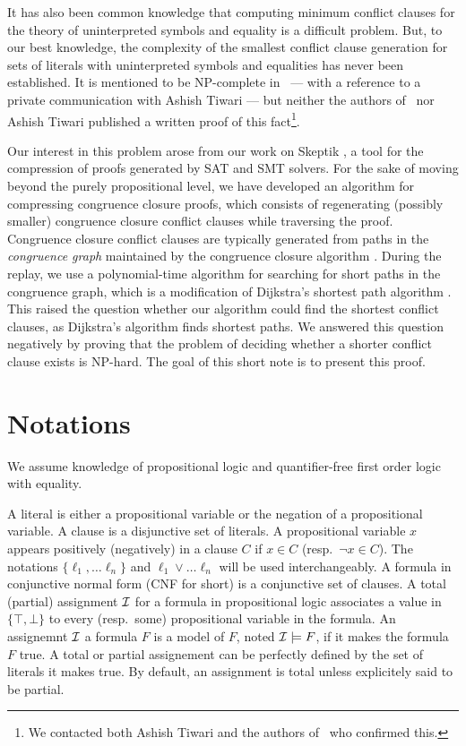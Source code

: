 \documentclass{easychair}
\begin{document}
It has also been common knowledge that computing minimum conflict clauses for
the theory of uninterpreted symbols and equality is a difficult problem.  But,
to our best knowledge, the complexity of the smallest conflict clause generation
for sets of literals with uninterpreted symbols and equalities has never been
established.  It is mentioned to be NP-complete in~\cite{Nieuwenhuis8} --- with
a reference to a private communication with Ashish Tiwari --- but neither the
authors of~\cite{Nieuwenhuis8} nor Ashish Tiwari published a written proof of
this fact\footnote{We contacted both Ashish Tiwari and the authors
  of~\cite{Nieuwenhuis8} who confirmed this.}.

Our interest in this problem arose from our work on Skeptik \cite{Boudou1}, a tool for the compression of proofs generated by SAT and SMT solvers. For the sake of moving beyond the purely propositional level, we have developed an algorithm for compressing congruence closure proofs, which consists of regenerating (possibly smaller) congruence closure conflict clauses while traversing the proof. Congruence closure conflict clauses are typically generated from paths in the \emph{congruence graph} maintained by the congruence closure algorithm \cite{Fontaine2004,Nieuwenhuis6,Nieuwenhuis9}. During the replay, we use a polynomial-time algorithm for searching for short paths in the congruence graph, which is a modification of Dijkstra's shortest path algorithm \cite{Dijkstra1959}. This raised the question whether our algorithm could find the shortest conflict clauses, as Dijkstra's algorithm finds shortest paths. We answered this question negatively by proving that the problem of deciding whether a shorter conflict clause exists is NP-hard. The goal of this short note is to present this proof.



\section*{Notations}

We assume knowledge of propositional logic and quantifier-free first order logic
with equality.  

A literal is either a propositional variable or the negation of a propositional
variable.  A clause is a disjunctive set of literals.  A propositional variable
$x$ appears positively (negatively) in a clause $C$ if $x \in C$ (resp.\ $\neg x
\in C$).  The notations $\{\ell_1, \dots \ell_n\}$ and $\ell_1 \vee \dots
\ell_n$ will be used interchangeably.  A formula in conjunctive normal form (CNF
for short) is a conjunctive set of clauses.  A total (partial) assignment $\cal
I$ for a formula in propositional logic associates a value in $\{\top, \bot\}$
to every (resp.\ some) propositional variable in the formula.  An assignemnt
$\cal I$ a formula $F$ is a model of $F$, noted ${\cal I}\models F$, if it makes
the formula $F$ true.  A total or partial assignement can be perfectly defined
by the set of literals it makes true.  By default, an assignment is total unless
explicitely said to be partial.
\end{document}
